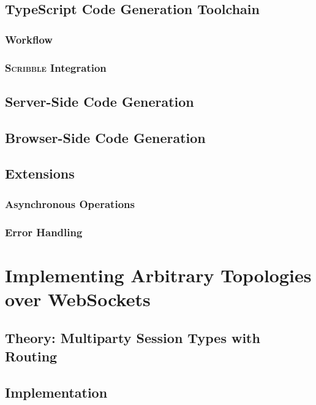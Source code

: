 \documentclass[12pt,twoside]{report}
\begin{document}
\chapter{TypeScript Code Generation Toolchain}

\section{Workflow}

\section{\textsc{Scribble} Integration}

\chapter{Server-Side Code Generation}

\chapter{Browser-Side Code Generation}

\chapter{Extensions}

\section{Asynchronous Operations}

\section{Error Handling}

\part{Implementing Arbitrary Topologies over WebSockets}

\chapter{Theory: Multiparty Session Types with Routing}

\chapter{Implementation}
\end{document}
